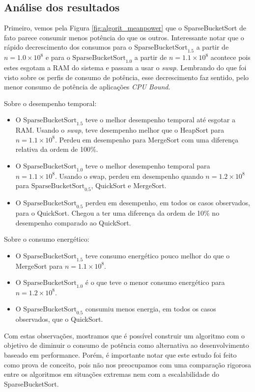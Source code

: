 \subsection{Análise dos resultados}

Primeiro, vemos pela Figura \ref{fig:algorit_meanpower} que o SparseBucketSort de fato parece consumir menos potência do que os outros. Interessante notar que o rápido decrescimento dos consumos para o $ \text{SparseBucketSort}_{1.5} $ a partir de $ n = 1.0 \times 10^8 $ e para o $ \text{SparseBucketSort}_{1.0} $ a partir de $ n = 1.1 \times 10^8 $ acontece pois estes esgotam a RAM do sistema e passam a usar o \emph{swap}. Lembrando do que foi visto sobre os perfis de consumo de potência, esse decrescimento faz sentido, pelo menor consumo de potência de aplicações \emph{CPU Bound}.

Sobre o desempenho temporal:
\begin{itemize}
  \item O $ \text{SparseBucketSort}_{1.5} $ teve o melhor desempenho temporal até esgotar a RAM. Usando o \emph{swap}, teve desempenho melhor que o HeapSort para $ n = 1.1 \times 10^8 $. Perdeu em desempenho para MergeSort com uma diferença relativa da ordem de 100\%.
  \item O $ \text{SparseBucketSort}_{1.0} $ teve o melhor desempenho temporal para $ n = 1.1 \times 10^8 $. Usando o swap, perdeu em desempenho quando $ n = 1.2 \times 10^8 $ para $ \text{SparseBucketSort}_{0.5} $, QuickSort e MergeSort.
  \item O $ \text{SparseBucketSort}_{0.5} $ perdeu em desempenho, em todos os casos observados, para o QuickSort. Chegou a ter uma diferença da ordem de 10\% no desempenho comparado ao QuickSort.
\end{itemize}

Sobre o consumo energético:
\begin{itemize}
  \item O $ \text{SparseBucketSort}_{1.5} $ teve consumo energético pouco melhor do que o MergeSort para $ n = 1.1 \times 10^8 $.
  \item O $ \text{SparseBucketSort}_{1.0} $ é o que teve o menor consumo energético para $ n = 1.2 \times 10^8 $.
  \item O $ \text{SparseBucketSort}_{0.5} $ consumiu menos energia, em todos os casos observados, que o QuickSort.
\end{itemize}

Com estas observações, mostramos que é possível construir um algoritmo com o objetivo de diminuir o consumo de potência como alternativa ao desenvolvimento baseado em performance. Porém, é importante notar que este estudo foi feito como prova de conceito, pois não nos preocupamos com uma comparação rigorosa entre os algoritmos em situações extremas nem com a escalabilidade do SparseBucketSort.

